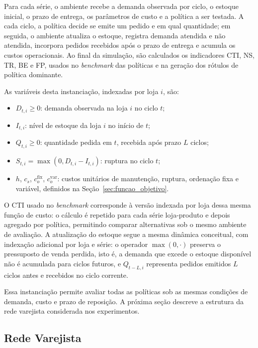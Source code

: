 Para cada série, o ambiente recebe a demanda observada por ciclo, o estoque inicial, o prazo de entrega, os parâmetros de custo e a política a ser testada. A cada ciclo, a política decide se emite um pedido e em qual quantidade; em seguida, o ambiente atualiza o estoque, registra demanda atendida e não atendida, incorpora pedidos recebidos após o prazo de entrega e acumula os custos operacionais. Ao final da simulação, são calculados os indicadores CTI, NS, TR, BE e FP, usados no \textit{benchmark} das políticas e na geração dos rótulos de política dominante.

As variáveis desta instanciação, indexadas por loja $i$, são:

\begin{itemize}
  \item $D_{t,i} \geq 0$: demanda observada na loja $i$ no ciclo $t$;
  \item $I_{t,i}$: nível de estoque da loja $i$ no início de $t$;
  \item $Q_{t,i} \geq 0$: quantidade pedida em $t$, recebida após prazo $L$ ciclos;
  \item $S_{t,i} = \max(0, D_{t,i} - I_{t,i})$: ruptura no ciclo $t$;
  \item $h$, $c_s$, $c_o^{\text{fix}}$, $c_o^{\text{var}}$: custos unitários de manutenção, ruptura, ordenação fixa e variável, definidos na Seção~\ref{sec:funcao_objetivo}.
\end{itemize}

O CTI usado no \textit{benchmark} corresponde à versão indexada por loja dessa mesma função de custo: o cálculo é repetido para cada série loja-produto e depois agregado por política, permitindo comparar alternativas sob o mesmo ambiente de avaliação. A atualização do estoque segue a mesma dinâmica conceitual, com indexação adicional por loja e série: o operador $\max(0,\cdot)$ preserva o pressuposto de venda perdida, isto é, a demanda que excede o estoque disponível não é acumulada para ciclos futuros, e $Q_{t-L,i}$ representa pedidos emitidos $L$ ciclos antes e recebidos no ciclo corrente.

Essa instanciação permite avaliar todas as políticas sob as mesmas condições de demanda, custo e prazo de reposição. A próxima seção descreve a estrutura da rede varejista considerada nos experimentos.

\subsection{Rede Varejista}


